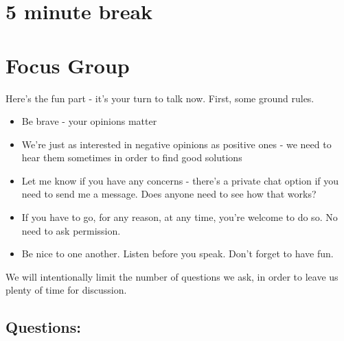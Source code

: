 \section*{5 minute break}

\section*{Focus Group}

\noindent Here’s the fun part - it’s your turn to talk now. First, some ground rules.
\begin{itemize}
    \item Be brave - your opinions matter
    \item We’re just as interested in negative opinions as positive ones - we need to hear them sometimes in order to find good solutions
    \item Let me know if you have any concerns - there’s a private chat option if you need to send me a message. Does anyone need to see how that works?
    \item If you have to go, for any reason, at any time, you’re welcome to do so. No need to ask permission.
    \item Be nice to one another. Listen before you speak. Don’t forget to have fun.
\end{itemize}

\noindent We will intentionally limit the number of questions we ask, in order to leave us
plenty of time for discussion.

\subsection*{Questions:}

